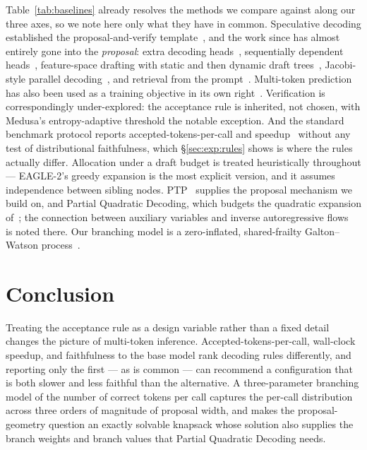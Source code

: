 \documentclass{article} %
\makeatletter
\newenvironment{ai}
  {\color{lightgray}%
   \@ifpackageloaded{caption}{\captionsetup{font={color=lightgray}}}{}%
   \let\ai@savedfloatreset\@floatboxreset
   \g@addto@macro\@floatboxreset{\color{lightgray}}}
  {\global\let\@floatboxreset\ai@savedfloatreset}
\makeatother
\begin{document}
\begin{ai}
Table~\ref{tab:baselines} already resolves the methods we compare against along
our three axes, so we note here only what they have in common. Speculative
decoding established the proposal-and-verify
template~\citep{leviathan2023speculative,chen2023accelerating}, and the work
since has almost entirely gone into the \emph{proposal}: extra decoding
heads~\citep{stern2018blockwise,cai2024medusa}, sequentially dependent
heads~\citep{ankner2024hydra}, feature-space drafting with static and then
dynamic draft trees~\citep{li2024eagle,li2024eagle2}, Jacobi-style parallel
decoding~\citep{fu2024lookahead}, and retrieval from the
prompt~\citep{saxena2023pld}. Multi-token prediction has also been used as a
training objective in its own right~\citep{gloeckle2024multitoken}. Verification
is correspondingly under-explored: the acceptance rule is inherited, not chosen,
with Medusa's entropy-adaptive threshold the notable exception. And the standard
benchmark protocol reports accepted-tokens-per-call and
speedup~\citep{xia2024specbench} without any test of distributional
faithfulness, which \S\ref{sec:exp:rules} shows is where the rules actually
differ. Allocation under a draft budget is treated heuristically throughout ---
EAGLE-2's greedy expansion is the most explicit version, and it assumes
independence between sibling nodes. PTP~\citep{draxler2025ptp} supplies the
proposal mechanism we build on, and Partial Quadratic Decoding, which budgets the
quadratic expansion of~\citet{samragh2025future}; the connection
between auxiliary variables and inverse autoregressive
flows~\citep{kingma2016iaf} is noted there. Our branching model is a
zero-inflated, shared-frailty Galton--Watson process~\citep{athreya1972branching}.

\section{Conclusion}

Treating the acceptance rule as a design variable rather than a fixed detail
changes the picture of multi-token inference. Accepted-tokens-per-call,
wall-clock speedup, and faithfulness to the base model rank decoding rules
differently, and reporting only the first --- as is common --- can recommend a
configuration that is both slower and less faithful than the alternative. A
three-parameter branching model of the number of correct tokens per call captures
the per-call distribution across three orders of magnitude of proposal width, and
makes the proposal-geometry question an exactly solvable knapsack whose solution
also supplies the branch weights and branch values that Partial Quadratic
Decoding needs.


\end{ai}
\end{document}
